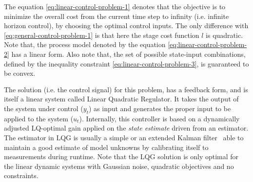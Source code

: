 The equation \ref{eq:linear-control-problem-1}  denotes that the objective is to minimize the overall cost from the current time step to infinity (i.e. infinite horizon control), by choosing the optimal control inputs.  The only difference with \ref{eq:general-control-problem-1} is that here the stage cost function $l$ is quadratic.
Note that, the process model denoted by the equation \ref{eq:linear-control-problem-2}   has a linear form. Also note that, the set of possible state-input combinations,  defined by  the inequality constraint \ref{eq:linear-control-problem-3},  is guaranteed to be convex. 
  
 The solution (i.e. the control signal) for this problem, has a feedback form, and is itself a linear system called Linear Quadratic Regulator\cite{lqr}. It takes the output of the system under control ($y_t$) as input and generates the proper input to be applied to the system ($u_t$). 
 Internally, this controller is based on a dynamically adjusted LQ-optimal gain applied on the \textit{state estimate} driven from an estimator. 
 The estimator in LQG is usually a simple or an extended Kalman filter~\cite{welch_introduction_1995}  able to maintain a good estimate of model unknowns by calibrating itself to measurements during runtime.
 Note that the LQG solution is only optimal for the linear dynamic systems with Gaussian noise, quadratic objectives and no constraints. 
   

